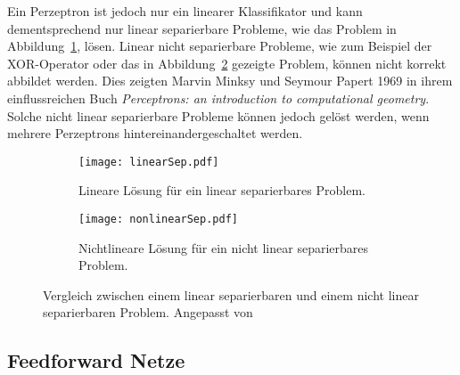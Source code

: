 Ein Perzeptron ist jedoch nur ein linearer Klassifikator und kann dementsprechend nur linear separierbare Probleme, wie das Problem in Abbildung~\ref{subfig:linearSep}, lösen.
Linear nicht separierbare Probleme, wie zum Beispiel der XOR-Operator oder das in Abbildung~\ref{subfig:nonlinearSep} gezeigte Problem, können nicht korrekt abbildet werden.
Dies zeigten Marvin Minksy und Seymour Papert 1969 in ihrem einflussreichen Buch \textit{Perceptrons: an introduction to computational geometry}. 
Solche nicht linear separierbare Probleme können jedoch gelöst werden, wenn mehrere Perzeptrons hintereinandergeschaltet werden.


\begin{figure}[h]
	\centering
	\begin{subfigure}[t]{0.4\textwidth}
		\texttt{[image: linearSep.pdf]}
		\caption{Lineare Lösung für ein linear separierbares Problem.}
		\label{subfig:linearSep}
	\end{subfigure}
	\quad
	\begin{subfigure}[t]{0.4\textwidth}
		\texttt{[image: nonlinearSep.pdf]}
		\caption{Nichtlineare Lösung für ein nicht linear separierbares Problem.}
		\label{subfig:nonlinearSep}
	\end{subfigure}
	\caption{Vergleich zwischen einem linear separierbaren und einem nicht linear separierbaren Problem. Angepasst von \cite{LinSep}}
	\label{fig:linearNonlinearVgl}
\end{figure}

\subsection{Feedforward Netze}


